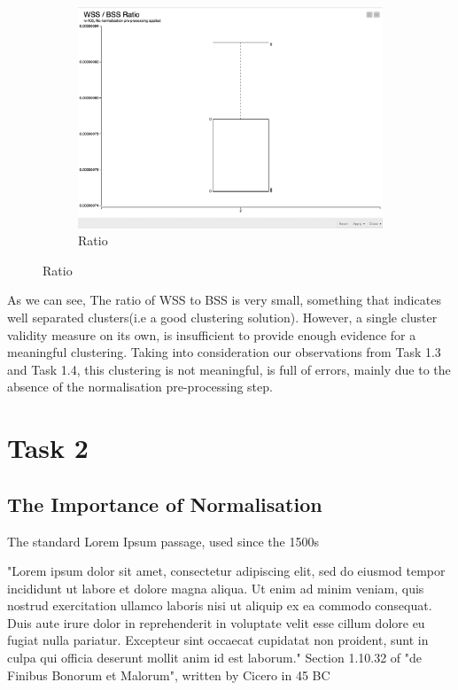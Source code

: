 \documentclass[11pt]{article}
\begin{document}
\begin{figure}[H]
\begin{subfigure}{0.4\textwidth}
						\includegraphics[width=\textwidth]{res/task-1/WSS-BSS-Ratio}
						\caption{Ratio}
						\label{fig:third}
					\end{subfigure}
					\label{fig:figures}	
				\end{figure}
				\fi
				As we can see, The ratio of WSS to BSS is very small, something that indicates well separated clusters(i.e a good clustering solution). However, a single cluster validity measure on its own, is insufficient to provide enough evidence for a meaningful clustering. Taking into consideration our observations from Task 1.3 and Task 1.4, this clustering \cite{???}is not meaningful, is full of
				errors, mainly due to the absence of the normalisation pre-processing step.
	\section*{Task 2}
		\subsection*{The Importance of Normalisation}
			The standard Lorem Ipsum passage, used since the 1500s
			
			"Lorem ipsum dolor sit amet, consectetur adipiscing elit, sed do eiusmod tempor incididunt ut labore et dolore magna aliqua. Ut enim ad minim veniam, quis nostrud exercitation ullamco laboris nisi ut aliquip ex ea commodo consequat. Duis aute irure dolor in reprehenderit in voluptate velit esse cillum dolore eu fugiat nulla pariatur. Excepteur sint occaecat cupidatat non proident, sunt in culpa qui officia deserunt mollit anim id est laborum."
			Section 1.10.32 of "de Finibus Bonorum et Malorum", written by Cicero in 45 BC
\end{document}
